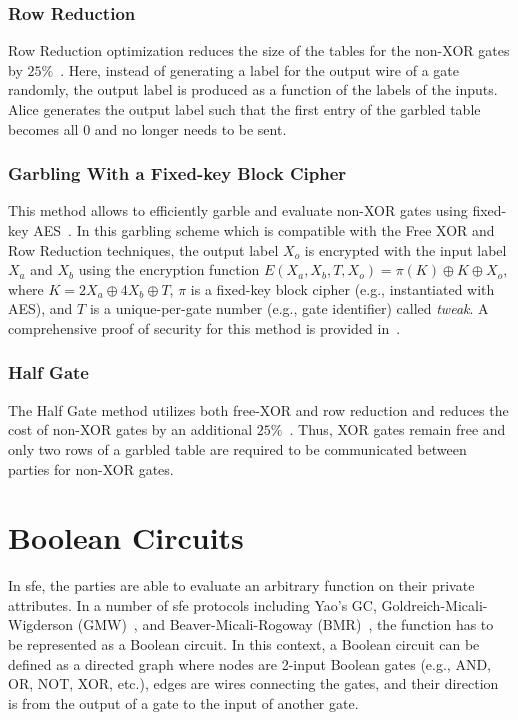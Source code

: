 \subsubsection{Row Reduction}\label{sssec:prelim-row}
Row Reduction optimization reduces the size of the tables for the non-XOR gates by $25\%$~\cite{naor1999privacy}.
Here, instead of generating a label for the output wire of a gate randomly, the output label is produced as a function of the labels of the inputs.
Alice generates the output label such that the first entry of the garbled table becomes all $0$ and no longer needs to be sent.

\subsubsection{Garbling With a Fixed-key Block Cipher}\label{sssec:prelim-aes}
This method allows to efficiently garble and evaluate non-XOR gates using fixed-key AES~\cite{bellare2013efficient}.
In this garbling scheme which is compatible with the Free XOR and Row Reduction techniques, the output label $X_{o}$ is encrypted with the input label $X_{a}$ and $X_{b}$ using the encryption function $E(X_a,X_b,T,X_o) = \pi(K) \oplus K \oplus X_o$, where $K=2X_a\oplus4X_b\oplus T$, $\pi$ is a fixed-key block cipher (e.g., instantiated with AES), and $T$ is a unique-per-gate number (e.g., gate identifier) called \emph{tweak}.
A comprehensive proof of security for this method is provided in~\cite{bellare2013efficient}.

\subsubsection{Half Gate}\label{sssec:prelim-half}
The Half Gate method utilizes both free-XOR and row reduction and reduces the cost of non-XOR gates by an additional $25\%$~\cite{zahur2015two}.
Thus, XOR gates remain free and only two rows of a garbled table are required to be communicated between parties for non-XOR gates.

\section{Boolean Circuits}\label{sec:prelim-circuit}
In \acrshort{sfe}, the parties are able to evaluate an arbitrary function on their private attributes.
In a number of \acrshort{sfe} protocols including Yao's GC, Goldreich-Micali-Wigderson (GMW)~\cite{goldreich1987play}, and Beaver-Micali-Rogoway (BMR)~\cite{beaver1990round}, the function has to be represented as a Boolean circuit.
In this context, a Boolean circuit can be defined as a directed graph where nodes are 2-input Boolean gates (e.g., AND, OR, NOT, XOR, etc.), edges are wires connecting the gates, and their direction is from the output of a gate to the input of another gate.

